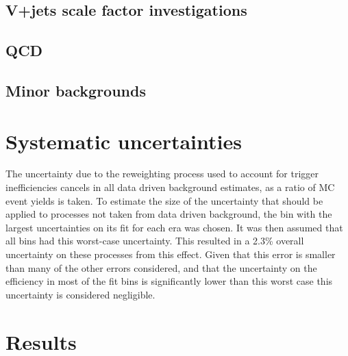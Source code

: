 \subsection{V+jets scale factor investigations}%
\label{sec:parkedscalefactors}

\subsection{QCD}%
\label{sec:parkedQCD}

\subsection{Minor backgrounds}%
\label{sec:parkedminor}

\section{Systematic uncertainties}%
\label{sec:parkedsyst}
The uncertainty due to the reweighting process used to account for trigger inefficiencies cancels in all data driven background estimates, as a ratio of \ac{MC} event yields is taken. To estimate the size of the uncertainty that should be applied to processes not taken from data driven background, the bin with the largest uncertainties on its fit for each era was chosen. It was then assumed that all bins had this worst-case uncertainty. This resulted in a 2.3\% overall uncertainty on these processes from this effect. Given that this error is smaller than many of the other errors considered, and that the uncertainty on the efficiency in most of the fit bins is significantly lower than this worst case this uncertainty is considered negligible.



\section{Results}%
\label{sec:parkedresults}
